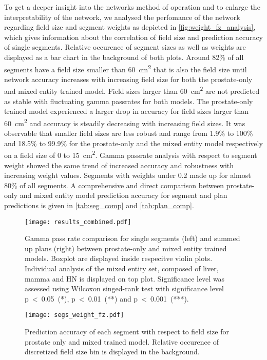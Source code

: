 To get a deeper insight into the networks method of operation and to enlarge the interpretability of the network, we analysed the perfomance of the network regarding field size and segment weights as depicted in \autoref{fig:weight_fz_analysis}, which gives information about the correlation of field size and prediction accuracy of single segments. 
Relative occurence of segment sizes as well as weights are displayed as a bar chart in the background of both plots.
Around 82\% of all segments have a field size smaller than 60~cm\textsuperscript{2} that is also the field size until network accuracy increases with increasing field size for both the prostate-only and mixed entity trained model.
Field sizes larger than 60~cm\textsuperscript{2} are not predicted as stable with fluctuating gamma passrates for both models.
The prostate-only trained model experienced a larger drop in accuracy for field sizes larger than 60~cm\textsuperscript{2} and accuracy is steadily decreasing with increasing field sizes. 
It was observable that smaller field sizes are less robust and range from 1.9\% to 100\% and 18.5\% to 99.9\% for the prostate-only and the mixed entity model respectively on a field size of 0 to 15~cm\textsuperscript{2}.
Gamma passrate analysis with respect to segment weight showed the same trend of increased accuracy and robustness with increasing weight values.
Segments with weights under 0.2 made up for almost 80\% of all segments. 
A comprehensive and direct comparison between prostate-only and mixed entity model prediction accuracy for segment and plan predictions is given in \autoref{tab:seg_comp} and \autoref{tab:plan_comp}.

\begin{figure}[htb]
    \centering
    \texttt{[image: results\_combined.pdf]}
    \caption{
        Gamma pass rate comparison for single segments (left) and summed up plans (right) between prostate-only and mixed entity trained models. 
        Boxplot are displayed inside respecitve violin plots. 
        Individual analysis of the mixed entity set, composed of liver, mamma and \acs{HN} is displayed on top plot. 
        Significance level was assessed using Wilcoxon singed-rank test with significance level p~<~0.05~(*), p~<~0.01~(**) and p~<~0.001~(***).
    }\label{fig:comparison}
\end{figure}

\newpage

\begin{figure}[!h]
    \centering
    \texttt{[image: segs\_weight\_fz.pdf]}
    \caption{
        Prediction accuracy of each segment with respect to field size for prostate only and mixed trained model. 
        Relative occurence of discretized field size bin is displayed in the background.}\label{fig:weight_fz_analysis}
\end{figure}

